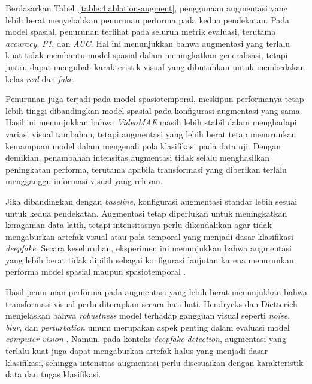 Berdasarkan Tabel~\ref{table:4.ablation-augment}, penggunaan augmentasi yang lebih berat menyebabkan penurunan performa pada kedua pendekatan. Pada model spasial, penurunan terlihat pada seluruh metrik evaluasi, terutama \textit{accuracy}, \textit{F1}, dan \textit{AUC}. Hal ini menunjukkan bahwa augmentasi yang terlalu kuat tidak membantu model spasial dalam meningkatkan generalisasi, tetapi justru dapat mengubah karakteristik visual yang dibutuhkan untuk membedakan kelas \textit{real} dan \textit{fake}.

Penurunan juga terjadi pada model spasiotemporal, meskipun performanya tetap lebih tinggi dibandingkan model spasial pada konfigurasi augmentasi yang sama. Hasil ini menunjukkan bahwa \textit{VideoMAE} masih lebih stabil dalam menghadapi variasi visual tambahan, tetapi augmentasi yang lebih berat tetap menurunkan kemampuan model dalam mengenali pola klasifikasi pada data uji. Dengan demikian, penambahan intensitas augmentasi tidak selalu menghasilkan peningkatan performa, terutama apabila transformasi yang diberikan terlalu mengganggu informasi visual yang relevan.

Jika dibandingkan dengan \textit{baseline}, konfigurasi augmentasi standar lebih sesuai untuk kedua pendekatan. Augmentasi tetap diperlukan untuk meningkatkan keragaman data latih, tetapi intensitasnya perlu dikendalikan agar tidak mengaburkan artefak visual atau pola temporal yang menjadi dasar klasifikasi \textit{deepfake}. Secara keseluruhan, eksperimen ini menunjukkan bahwa augmentasi yang lebih berat tidak dipilih sebagai konfigurasi lanjutan karena menurunkan performa model spasial maupun spasiotemporal \cite{MUMUNI2022100258}\cite{yan2023deepfakebenchcomprehensivebenchmarkdeepfake}.

Hasil penurunan performa pada augmentasi yang lebih berat menunjukkan bahwa transformasi visual perlu diterapkan secara hati-hati. Hendrycks dan Dietterich menjelaskan bahwa \textit{robustness} model terhadap gangguan visual seperti \textit{noise}, \textit{blur}, dan \textit{perturbation} umum merupakan aspek penting dalam evaluasi model \textit{computer vision} \cite{hendrycks2019benchmarkingneuralnetworkrobustness}. Namun, pada konteks \textit{deepfake detection}, augmentasi yang terlalu kuat juga dapat mengaburkan artefak halus yang menjadi dasar klasifikasi, sehingga intensitas augmentasi perlu disesuaikan dengan karakteristik data dan tugas klasifikasi.


